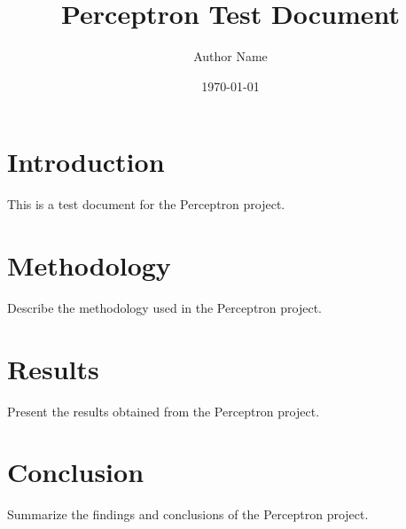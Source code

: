 \documentclass{article}
\begin{document}
\title{Perceptron Test Document}
\author{Author Name}
\date{\today}

\maketitle

\section{Introduction}
This is a test document for the Perceptron project.

\section{Methodology}
Describe the methodology used in the Perceptron project.

\section{Results}
Present the results obtained from the Perceptron project.

\section{Conclusion}
Summarize the findings and conclusions of the Perceptron project.
\end{document}
